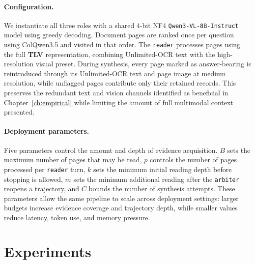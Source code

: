 \paragraph{Configuration.} We instantiate all three roles with a shared 4-bit NF4 \texttt{Qwen3-VL-8B-Instruct} model using greedy decoding. Document pages are ranked once per question using ColQwen3.5 and visited in that order. The \texttt{reader} processes pages using the full \textbf{TLV} representation, combining Unlimited-OCR text with the high-resolution visual preset. During synthesis, every page marked as answer-bearing is reintroduced through its Unlimited-OCR text and page image at medium resolution, while unflagged pages contribute only their retained records. This preserves the redundant text and vision channels identified as beneficial in Chapter~\ref{ch:empirical} while limiting the amount of full multimodal context presented.

\paragraph{Deployment parameters.} Five parameters control the amount and depth of evidence acquisition. \(B\) sets the maximum number of pages that may be read, \(p\) controls the number of pages processed per \texttt{reader} turn, \(k\) sets the minimum initial reading depth before stopping is allowed, \(m\) sets the minimum additional reading after the \texttt{arbiter} reopens a trajectory, and \(C\) bounds the number of synthesis attempts. These parameters allow the same pipeline to scale across deployment settings: larger budgets increase evidence coverage and trajectory depth, while smaller values reduce latency, token use, and memory pressure.

\section{Experiments}
\label{sec:simple_method_experiments}

